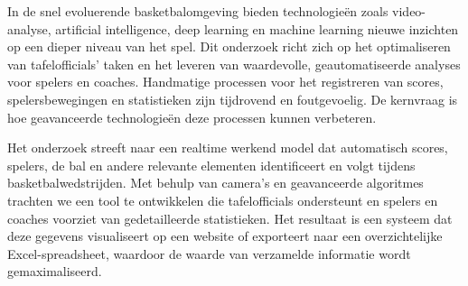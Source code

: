 



In de snel evoluerende basketbalomgeving bieden technologieën zoals video-analyse, artificial intelligence, deep learning en machine learning nieuwe inzichten op een dieper niveau van het spel. Dit onderzoek richt zich op het optimaliseren van tafelofficials' taken en het leveren van waardevolle, geautomatiseerde analyses voor spelers en coaches. Handmatige processen voor het registreren van scores, spelersbewegingen en statistieken zijn tijdrovend en foutgevoelig. De kernvraag is hoe geavanceerde technologieën deze processen kunnen verbeteren.

Het onderzoek streeft naar een realtime werkend model dat automatisch scores, spelers, de bal en andere relevante elementen identificeert en volgt tijdens basketbalwedstrijden. Met behulp van camera's en geavanceerde algoritmes trachten we een tool te ontwikkelen die tafelofficials ondersteunt en spelers en coaches voorziet van gedetailleerde statistieken. Het resultaat is een systeem dat deze gegevens visualiseert op een website of exporteert naar een overzichtelijke Excel-spreadsheet, waardoor de waarde van verzamelde informatie wordt gemaximaliseerd.

